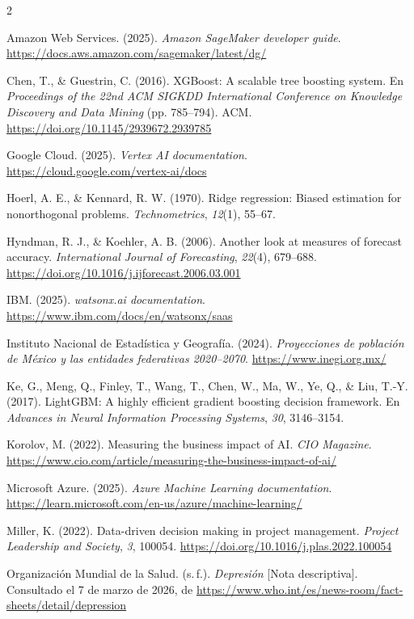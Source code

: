 \documentclass[12pt, letterpaper]{article}
\begin{document}
\begin{multicols}{2}
\small
\setlength{\parindent}{0pt}
\setlength{\hangafter}{1}
\setlength{\parskip}{6pt}
\everypar{\hangindent=1.27cm}

Amazon Web Services. (2025). \textit{Amazon SageMaker developer guide}. \url{https://docs.aws.amazon.com/sagemaker/latest/dg/}

Chen, T., \& Guestrin, C. (2016). XGBoost: A scalable tree boosting system. En \textit{Proceedings of the 22nd ACM SIGKDD International Conference on Knowledge Discovery and Data Mining} (pp. 785--794). ACM. \url{https://doi.org/10.1145/2939672.2939785}

Google Cloud. (2025). \textit{Vertex AI documentation}. \url{https://cloud.google.com/vertex-ai/docs}

Hoerl, A. E., \& Kennard, R. W. (1970). Ridge regression: Biased estimation for nonorthogonal problems. \textit{Technometrics}, \textit{12}(1), 55--67.

Hyndman, R. J., \& Koehler, A. B. (2006). Another look at measures of forecast accuracy. \textit{International Journal of Forecasting}, \textit{22}(4), 679--688. \url{https://doi.org/10.1016/j.ijforecast.2006.03.001}

IBM. (2025). \textit{watsonx.ai documentation}. \url{https://www.ibm.com/docs/en/watsonx/saas}

Instituto Nacional de Estadística y Geografía. (2024). \textit{Proyecciones de población de México y las entidades federativas 2020--2070}. \url{https://www.inegi.org.mx/}

Ke, G., Meng, Q., Finley, T., Wang, T., Chen, W., Ma, W., Ye, Q., \& Liu, T.-Y. (2017). LightGBM: A highly efficient gradient boosting decision framework. En \textit{Advances in Neural Information Processing Systems}, \textit{30}, 3146--3154.

Korolov, M. (2022). Measuring the business impact of AI. \textit{CIO Magazine}. \url{https://www.cio.com/article/measuring-the-business-impact-of-ai/}

Microsoft Azure. (2025). \textit{Azure Machine Learning documentation}. \url{https://learn.microsoft.com/en-us/azure/machine-learning/}

Miller, K. (2022). Data-driven decision making in project management. \textit{Project Leadership and Society}, \textit{3}, 100054. \url{https://doi.org/10.1016/j.plas.2022.100054}

Organización Mundial de la Salud. (s.\,f.). \textit{Depresión} [Nota descriptiva]. Consultado el 7 de marzo de 2026, de \url{https://www.who.int/es/news-room/fact-sheets/detail/depression}


\end{multicols}
\end{document}
